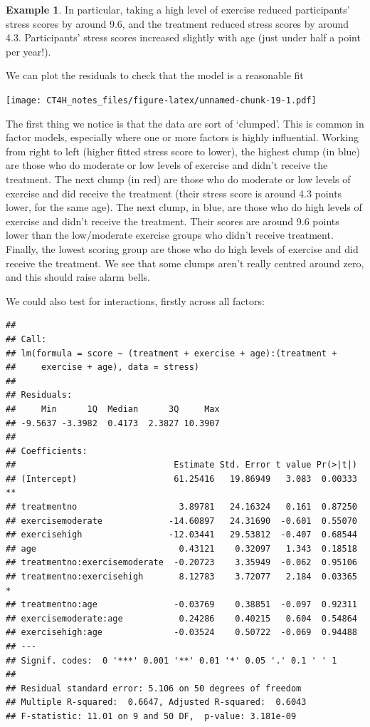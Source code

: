 \documentclass[
  openany]{book}
\theoremstyle{definition}
\theoremstyle{definition}
\newtheorem{example}{Example}[chapter]
\theoremstyle{definition}
\theoremstyle{definition}
\theoremstyle{remark}
\begin{document}
\begin{example}
In particular, taking a high level of exercise reduced participants' stress scores by around 9.6, and the treatment reduced stress scores by around 4.3. Participants' stress scores increased slightly with age (just under half a point per year!).

We can plot the residuals to check that the model is a reasonable fit

\texttt{[image: CT4H\_notes\_files/figure-latex/unnamed-chunk-19-1.pdf]}

The first thing we notice is that the data are sort of `clumped'. This is common in factor models, especially where one or more factors is highly influential. Working from right to left (higher fitted stress score to lower), the highest clump (in blue) are those who do moderate or low levels of exercise and didn't receive the treatment. The next clump (in red) are those who do moderate or low levels of exercise and did receive the treatment (their stress score is around 4.3 points lower, for the same age). The next clump, in blue, are those who do high levels of exercise and didn't receive the treatment. Their scores are around 9.6 points lower than the low/moderate exercise groups who didn't receive treatment. Finally, the lowest scoring group are those who do high levels of exercise and did receive the treatment. We see that some clumps aren't really centred around zero, and this should raise alarm bells.

We could also test for interactions, firstly across all factors:

\begin{verbatim}
## 
## Call:
## lm(formula = score ~ (treatment + exercise + age):(treatment + 
##     exercise + age), data = stress)
## 
## Residuals:
##     Min      1Q  Median      3Q     Max 
## -9.5637 -3.3982  0.4173  2.3827 10.3907 
## 
## Coefficients:
##                               Estimate Std. Error t value Pr(>|t|)   
## (Intercept)                   61.25416   19.86949   3.083  0.00333 **
## treatmentno                    3.89781   24.16324   0.161  0.87250   
## exercisemoderate             -14.60897   24.31690  -0.601  0.55070   
## exercisehigh                 -12.03441   29.53812  -0.407  0.68544   
## age                            0.43121    0.32097   1.343  0.18518   
## treatmentno:exercisemoderate  -0.20723    3.35949  -0.062  0.95106   
## treatmentno:exercisehigh       8.12783    3.72077   2.184  0.03365 * 
## treatmentno:age               -0.03769    0.38851  -0.097  0.92311   
## exercisemoderate:age           0.24286    0.40215   0.604  0.54864   
## exercisehigh:age              -0.03524    0.50722  -0.069  0.94488   
## ---
## Signif. codes:  0 '***' 0.001 '**' 0.01 '*' 0.05 '.' 0.1 ' ' 1
## 
## Residual standard error: 5.106 on 50 degrees of freedom
## Multiple R-squared:  0.6647, Adjusted R-squared:  0.6043 
## F-statistic: 11.01 on 9 and 50 DF,  p-value: 3.181e-09
\end{verbatim}


\end{example}
\end{document}
